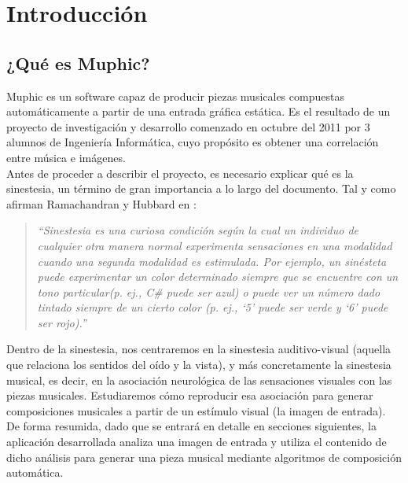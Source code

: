 \section{Introducción}


	\subsection{¿Qué es Muphic?}
	
		\vspace{0.2in}
		Muphic es un software capaz de producir piezas musicales compuestas automáticamente a partir de una entrada gráfica estática. Es el resultado de un proyecto de investigación y desarrollo comenzado en octubre del 2011 por 3 alumnos de Ingeniería Informática, cuyo propósito es obtener una correlación entre música e imágenes.\\
		
		Antes de proceder a describir el proyecto, es necesario explicar qué es la sinestesia, un término de gran importancia a lo largo del documento. Tal y como afirman Ramachandran y Hubbard en \cite[p.~4]{paperSyn}:
		
		\begin{quote}
		\emph{``Sinestesia es una curiosa condición según la cual un individuo de cualquier otra manera normal experimenta sensaciones en una modalidad cuando una segunda modalidad es estimulada. Por ejemplo, un sinésteta puede experimentar un color determinado siempre que se encuentre con un tono particular(p. ej., C\# puede ser azul) o puede ver un número dado tintado siempre de un cierto color (p. ej., ‘5’ puede ser verde y ‘6’ puede ser rojo).''}
		\end{quote}
		
		Dentro de la sinestesia, nos centraremos en la sinestesia auditivo-visual (aquella que relaciona los sentidos del oído y la vista), y más concretamente la sinestesia musical, es decir, en la asociación neurológica de las sensaciones visuales con las piezas musicales. Estudiaremos cómo reproducir esa asociación para generar composiciones musicales a partir de un estímulo visual (la imagen de entrada).\\
		 
		
		De forma resumida, dado que se entrará en detalle en secciones siguientes, la aplicación desarrollada analiza una imagen de entrada y utiliza el contenido de dicho análisis para generar una pieza musical mediante algoritmos de composición automática.\\
		
